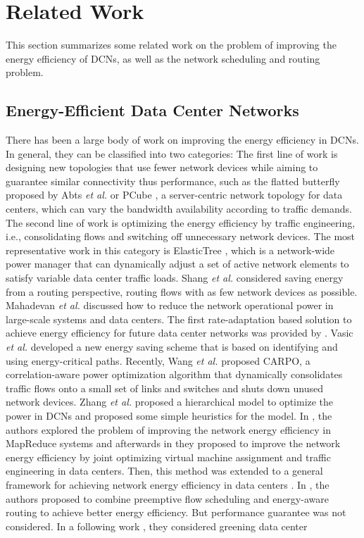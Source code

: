 \documentclass[10pt, conference, compsocconf]{IEEEtran}
\begin{document}
\section{Related Work}
\label{sec:related}

This section summarizes some related work on the problem of improving the energy efficiency of DCNs, as well as the network scheduling and routing problem.

\subsection{Energy-Efficient Data Center Networks}

There has been a large body of work on improving the energy efficiency in DCNs. In general, they can be classified into two categories: The first line of work is designing new topologies that use fewer network devices while aiming to guarantee similar connectivity thus performance, such as the flatted butterfly proposed by Abts \emph{et al.} \cite{Abts_Marty-2010} or PCube \cite{Huang_Jia-2011}, a server-centric network topology for data centers, which can vary the bandwidth availability according to traffic demands. The second line of work is optimizing the energy efficiency by traffic engineering, i.e., consolidating flows and switching off unnecessary network devices. The most representative work in this category is ElasticTree \cite{Heller_Seetharaman}, which is a network-wide power manager that can dynamically adjust a set of active network elements to satisfy variable data center traffic loads. Shang \emph{et al.} \cite{Shang_Li} considered saving energy from a routing perspective, routing flows with as few network devices as possible. Mahadevan \emph{et al.} \cite{Mahadevan_banerjee-2011} discussed how to reduce the network operational power in large-scale systems and data centers. The first rate-adaptation based solution to achieve energy efficiency for future data center networks was provided by \cite{Wang_Zhang-2013}. Vasic \emph{et al.} \cite{Vasic_Bhurat-2011} developed a new energy saving scheme that is based on identifying and using energy-critical paths. Recently, Wang \emph{et al.} \cite{Wang_Yao} proposed CARPO, a correlation-aware power optimization algorithm that dynamically consolidates traffic flows onto a small set of links and switches and shuts down unused network devices. Zhang \emph{et al.} \cite{Zhang_Ansari-2012} proposed a hierarchical model to optimize the power in DCNs and proposed some simple heuristics for the model. In \cite{Wang_Zhang-2013-ICCCN}, the authors explored the problem of improving the network energy efficiency in MapReduce systems and afterwards in \cite{Wang_Zhang-PER-2013} they proposed to improve the network energy efficiency by joint optimizing virtual machine assignment and traffic engineering in data centers. Then, this method was extended to a general framework for achieving network energy efficiency in data centers  \cite{Wang_Zhang-JSAC-2013}. In \cite{Shang_li-2013}, the authors proposed to combine preemptive flow scheduling and energy-aware routing to achieve better energy efficiency. But performance guarantee was not considered. In a following work \cite{Xu_Shang-2013}, they considered greening data center 
\end{document}
